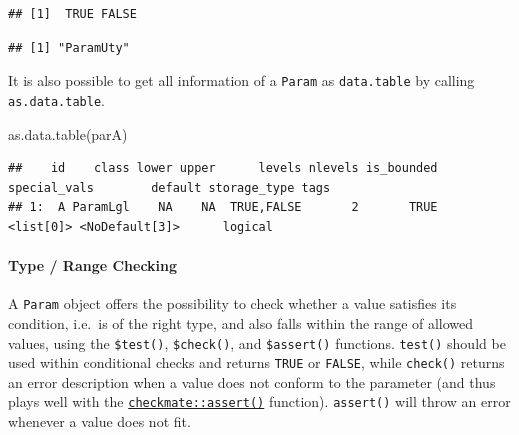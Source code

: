 \documentclass[
]{scrbook}
\newenvironment{Shaded}{\begin{snugshade}}{\end{snugshade}}
\newcommand{\ConstantTok}[1]{\textcolor[rgb]{0.00,0.00,0.00}{#1}}
\newcommand{\FunctionTok}[1]{\textcolor[rgb]{0.00,0.00,0.00}{#1}}
\newcommand{\NormalTok}[1]{#1}
\newcommand{\SpecialCharTok}[1]{\textcolor[rgb]{0.00,0.00,0.00}{#1}}
\renewenvironment{Shaded} {\begin{snugshade}\small} {\end{snugshade}}
\begin{document}
\begin{verbatim}
## [1]  TRUE FALSE
\end{verbatim}

\begin{Shaded}
\end{Shaded}

\begin{verbatim}
## [1] "ParamUty"
\end{verbatim}

It is also possible to get all information of a \texttt{Param} as \texttt{data.table} by calling \texttt{as.data.table}.

\begin{Shaded}
\begin{Highlighting}[]
\FunctionTok{as.data.table}\NormalTok{(parA)}
\end{Highlighting}
\end{Shaded}

\begin{verbatim}
##    id    class lower upper      levels nlevels is_bounded special_vals        default storage_type tags
## 1:  A ParamLgl    NA    NA  TRUE,FALSE       2       TRUE    <list[0]> <NoDefault[3]>      logical
\end{verbatim}

\hypertarget{type-range-checking}{%
\paragraph{Type / Range Checking}\label{type-range-checking}}

A \texttt{Param} object offers the possibility to check whether a value satisfies its condition, i.e.~is of the right type, and also falls within the range of allowed values, using the \texttt{\$test()}, \texttt{\$check()}, and \texttt{\$assert()} functions.
\texttt{test()} should be used within conditional checks and returns \texttt{TRUE} or \texttt{FALSE}, while \texttt{check()} returns an error description when a value does not conform to the parameter (and thus plays well with the \href{https://www.rdocumentation.org/packages/checkmate/topics/assert}{\texttt{checkmate::assert()}} function).
\texttt{assert()} will throw an error whenever a value does not fit.

\begin{Shaded}
\end{Shaded}
\end{document}
